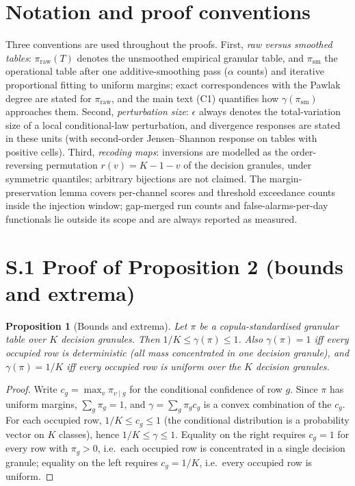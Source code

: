 \documentclass[11pt,a4paper]{article}
\newtheorem*{proposition}{Proposition}
\begin{document}
\section*{Notation and proof conventions}

Three conventions are used throughout the proofs. First, \emph{raw versus
smoothed tables}: $\pi_{\mathrm{raw}}(T)$ denotes the unsmoothed empirical
granular table, and $\pi_{\mathrm{sm}}$ the operational table after one
additive-smoothing pass ($\alpha$ counts) and iterative proportional
fitting to uniform margins; exact correspondences with the Pawlak degree
are stated for $\pi_{\mathrm{raw}}$, and the main text (C1) quantifies how
$\gamma(\pi_{\mathrm{sm}})$ approaches them. Second, \emph{perturbation
size}: $\epsilon$ always denotes the total-variation size of a local
conditional-law perturbation, and divergence responses are stated in
these units (with second-order Jensen--Shannon response on tables with
positive cells). Third, \emph{recoding maps}: inversions are modelled as
the order-reversing permutation $r(v)=K-1-v$ of the decision granules,
under symmetric quantiles; arbitrary bijections are not claimed. The
margin-preservation lemma covers per-channel scores and threshold
exceedance counts inside the injection window; gap-merged run counts and
false-alarms-per-day functionals lie outside its scope and are always
reported as measured.

\section*{S.1 Proof of Proposition 2 (bounds and extrema)}

\begin{proposition}[Bounds and extrema]
Let $\pi$ be a copula-standardised granular table over $K$ decision granules.
Then $1/K \le \gamma(\pi) \le 1$. Also $\gamma(\pi)=1$ iff every occupied
row is deterministic (all mass concentrated in one decision granule), and
$\gamma(\pi)=1/K$ iff every occupied row is uniform over the $K$ decision
granules.
\end{proposition}

\begin{proof}
Write $c_g=\max_v \pi_{v\mid g}$ for the conditional confidence of row $g$.
Since $\pi$ has uniform margins, $\sum_g \pi_g = 1$, and
$\gamma = \sum_g \pi_g c_g$ is a convex combination of the $c_g$. For each
occupied row, $1/K \le c_g \le 1$ (the conditional distribution is a
probability vector on $K$ classes), hence $1/K \le \gamma \le 1$. Equality on
the right requires $c_g=1$ for every row with $\pi_g>0$, i.e.\ each occupied
row is concentrated in a single decision granule; equality on the left
requires $c_g = 1/K$, i.e.\ every occupied row is uniform.
\end{proof}
\end{document}
